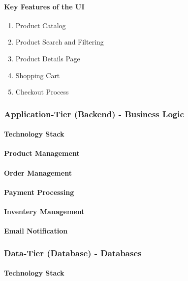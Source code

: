 \documentclass{llncs}
\begin{document}
\paragraph{Key Features of the UI}
    \begin{enumerate}
        \item Product Catalog
        \item Product Search and Filtering
        \item Product Details Page
        \item Shopping Cart
        \item Checkout Process
    \end{enumerate}
\subsubsection{Application-Tier (Backend) - Business Logic}
\paragraph{Technology Stack}
\paragraph{Product Management}
\paragraph{Order Management}
\paragraph{Payment Processing}
\paragraph{Inventery Management}
\paragraph{Email Notification}
\subsubsection{Data-Tier (Database) - Databases}
\paragraph{Technology Stack}
\end{document}
